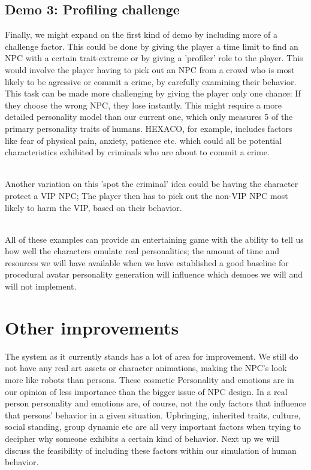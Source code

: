 \documentclass[11pt]{article} %
\begin{document}
\newpage
\subsection{Demo 3: Profiling challenge}
Finally, we might expand on the first kind of demo by including more of a challenge factor. This could be done by giving the player a time limit to find an NPC with a certain trait-extreme or by giving a 'profiler' role to the player. This would involve the player having to pick out an NPC from a crowd who is most likely to be agressive or commit a crime, by carefully examining their behavior. This task can be made more challenging by giving the player only one chance: If they choose the wrong NPC, they lose instantly. This might require a more detailed personality model than our current one, which only measures 5 of the primary personality traits of humans. HEXACO, for example, includes factors like fear of physical pain, anxiety, patience etc. which could all be potential characteristics exhibited by criminals who are about to commit a crime.

~\\
Another variation on this 'spot the criminal'  idea could be having the character protect a VIP NPC; The player then has to pick out the non-VIP NPC most likely to harm the VIP, based on their behavior. 

~\\
All of these examples can provide an entertaining game with the ability to tell us how well the characters emulate real personalities; the amount of time and resources we will have available when we have established a good baseline for procedural avatar personality generation will influence which demoes we will and will not implement.



\newpage
\section{Other improvements}
The system as it currently stands has a lot of area for improvement. We still do not have any real art assets or character animations, making the NPC's look more like robots than persons. These cosmetic Personality and emotions are in our opinion of less importance than the bigger issue of NPC design. In a real person personality and emotions are, of course, not the only factors that influence that persons' behavior in a given situation. Upbringing, inherited traits, culture, social standing, group dynamic etc are all very important factors when trying to decipher why someone exhibits a certain kind of behavior. Next up we will discuss the feasibility of including these factors within our simulation of human behavior.%
\end{document}
